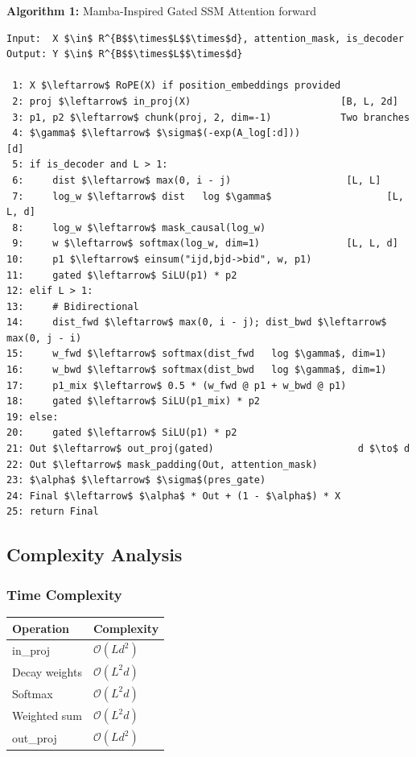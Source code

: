\textbf{Algorithm 1:} Mamba-Inspired Gated SSM Attention forward
\begin{lstlisting}
Input:  X $\in$ R^{B$$\times$L$$\times$d}, attention_mask, is_decoder
Output: Y $\in$ R^{B$$\times$L$$\times$d}

 1: X $\leftarrow$ RoPE(X) if position_embeddings provided
 2: proj $\leftarrow$ in_proj(X)                          [B, L, 2d]
 3: p1, p2 $\leftarrow$ chunk(proj, 2, dim=-1)            Two branches
 4: $\gamma$ $\leftarrow$ $\sigma$(-exp(A_log[:d]))                      [d]
 5: if is_decoder and L > 1:
 6:     dist $\leftarrow$ max(0, i - j)                    [L, L]
 7:     log_w $\leftarrow$ dist   log $\gamma$                    [L, L, d]
 8:     log_w $\leftarrow$ mask_causal(log_w)
 9:     w $\leftarrow$ softmax(log_w, dim=1)               [L, L, d]
10:     p1 $\leftarrow$ einsum("ijd,bjd->bid", w, p1)
11:     gated $\leftarrow$ SiLU(p1) * p2
12: elif L > 1:
13:     # Bidirectional
14:     dist_fwd $\leftarrow$ max(0, i - j); dist_bwd $\leftarrow$ max(0, j - i)
15:     w_fwd $\leftarrow$ softmax(dist_fwd   log $\gamma$, dim=1)
16:     w_bwd $\leftarrow$ softmax(dist_bwd   log $\gamma$, dim=1)
17:     p1_mix $\leftarrow$ 0.5 * (w_fwd @ p1 + w_bwd @ p1)
18:     gated $\leftarrow$ SiLU(p1_mix) * p2
19: else:
20:     gated $\leftarrow$ SiLU(p1) * p2
21: Out $\leftarrow$ out_proj(gated)                         d $\to$ d
22: Out $\leftarrow$ mask_padding(Out, attention_mask)
23: $\alpha$ $\leftarrow$ $\sigma$(pres_gate)
24: Final $\leftarrow$ $\alpha$ * Out + (1 - $\alpha$) * X
25: return Final
\end{lstlisting}

\subsection{Complexity Analysis}

\subsubsection{Time Complexity}

\begin{table}[H]
\centering
\small
\begin{tabular}{ll}
\toprule
\textbf{Operation} & \textbf{Complexity} \\
\midrule
in\_proj & $\mathcal{O}(L d^2)$ \\
Decay weights & $\mathcal{O}(L^2 d)$ \\
Softmax & $\mathcal{O}(L^2 d)$ \\
Weighted sum & $\mathcal{O}(L^2 d)$ \\
out\_proj & $\mathcal{O}(L d^2)$ \\
\bottomrule
\end{tabular}
\end{table}

